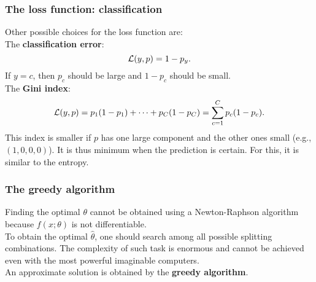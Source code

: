 \begin{frame}
\frametitle{The loss function: classification}
Other possible choices for the loss function are: \\
\vspace{0.3cm}
The {\bf classification error}: 
$$
{\cal L}(y,p) = 1 - p_y.
$$
If $y=c$, then $p_c$ should be large and $1-p_c$ should be small.\\
\vspace{0.3cm}
The {\bf Gini index}:
$$
{\cal L}(y,p) = p_1(1-p_1) + \cdots + p_C(1-p_C) = \sum_{c=1}^C p_c(1-p_c).
$$
This index is smaller if $p$ has one large component and the other ones small (e.g., $(1,0,0,0)$). It is thus minimum when the prediction is certain. For this, it is similar to the entropy.
\end{frame}
\begin{frame}
\frametitle{The greedy algorithm}
Finding the optimal $\theta$ cannot be obtained using a Newton-Raphson algorithm because $f(x;\theta)$ is not differentiable.\\ 
\vspace{0.3cm}
To obtain the optimal $\hat{\theta}$, one should search among all possible splitting combinations. The complexity of such task is enormous and cannot be achieved even with the most powerful imaginable computers. \\
\vspace{0.3cm}
An approximate solution is obtained by the {\bf greedy algorithm}.
\end{frame}
